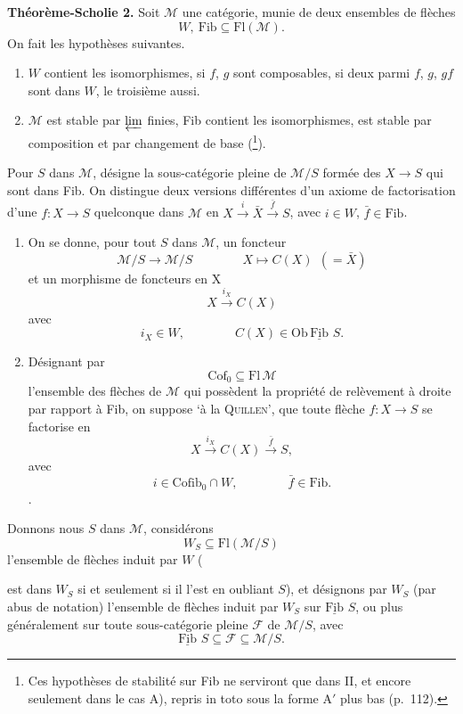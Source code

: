 \documentclass[11pt]{article}
\newcommand{\printedpage}[1]{\marginpar{\footnotesize p.~#1}}
\newcommand{\msp}[1]{\marginpar{\footnotesize [#1]}}
\newcommand{\Fib}{\underline{\mathrm{Fib}}\,}
\begin{document}
\msp{page 108}
\textbf{Théorème-Scholie 2.} Soit $\mathcal{M}$ une catégorie, munie de deux ensembles de flèches
\[
W,\ \mathrm{Fib}\subseteq\mathrm{Fl}(\mathcal{M}).
\]
On fait les hypothèses suivantes.

\begin{enumerate}[label={}]
\item[$1^o$] $W$ contient les isomorphismes, si $f$, $g$ sont composables, si deux parmi $f$, $g$, $gf$ sont dans $W$, le troisième aussi.
\item[$2^o$] $\mathcal{M}$ est stable par $\varprojlim$ finies, Fib contient les isomorphismes, est stable par composition et par changement de base (\footnote[59]{Ces hypothèses de stabilité sur Fib ne serviront que dans II, et encore seulement dans le cas A), repris in toto sous la forme A$'$ plus bas (p.~112).}).
\end{enumerate}

Pour $S$ dans $\mathcal{M}$, \fbox{$\Fib\,S$} désigne la sous-catégorie pleine de $\mathcal{M}/S$ formée des $X\longrightarrow S$ qui sont dans Fib. On distingue deux versions différentes d'un axiome de factorisation d'une $f : X\longrightarrow S$ quelconque dans $\mathcal{M}$ en $X\xrightarrow{i}\bar X\xrightarrow{\bar f}S$, avec $i\in W$, $\bar f\in\mathrm{Fib}$.


\printedpage{68}

\begin{enumerate}[label={}]
\item[A)] On se donne, pour tout $S$ dans $\mathcal{M}$, un foncteur
\[
\mathcal{M}/S\longrightarrow\mathcal{M}/S\qquad\qquad X\longmapsto C(X)\ \ (=\bar X)
\]
et un morphisme de foncteurs en $\mathrm{X}$
\[
X\xrightarrow{i_X}C(X)
\]
avec
\[
i_X\in W,\qquad\qquad C(X)\in\mathrm{Ob}\,\Fib\,S.
\]
\item[B)] Désignant par
\[
\mathrm{Cof}_0\subseteq\mathrm{Fl}\,\mathcal{M}
\]
l'ensemble des flèches de $\mathcal{M}$ qui possèdent la propriété de relèvement à droite par rapport à Fib, on suppose ‘à la \textsc{Quillen}’, que toute flèche $f : X\longrightarrow S$ se factorise en
\[
X\xrightarrow{i_X}C(X)\xrightarrow{\bar f}S,
\]
avec
\[
i\in\mathrm{Cofib}_0\cap W,\qquad\qquad\bar f\in\mathrm{Fib}.
\]
.
\end{enumerate}

\msp{page 109}
Donnons nous $S$ dans $\mathcal{M}$, considérons
\[
W_S\subseteq\mathrm{Fl}(\mathcal{M}/S)
\]
l'ensemble de flèches induit par $W$ (
est dans $W_S$ si et seulement si il l'est en oubliant $S$), et désignons par $W_S$ (par abus de notation) l'ensemble de flèches induit par $W_S$ sur $\Fib\,S$, ou plus généralement sur toute sous-catégorie pleine $\mathcal{F}$ de $\mathcal{M}/S$, avec
\[
\Fib\,S\subseteq\mathcal{F}\subseteq\mathcal{M}/S.
\]
\end{document}
